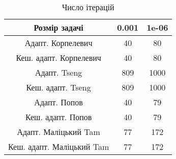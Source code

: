 \begin{table}[H]
	\centering
	\begin{tabular}{|c||c|c|}\hline
		Розмір задачі & 0.001 & 1e-06 \\ \hline \hline
		Адапт. Корпелевич & 40 & 80 \\ \hline
		Кеш. адапт. Корпелевич & 40 & 80 \\ \hline
		Адапт. Tseng & 809 & 1000 \\ \hline
		Кеш. адапт. Tseng & 809 & 1000 \\ \hline
		Адапт. Попов & 40 & 79 \\ \hline
		Кеш. адапт. Попов & 40 & 79 \\ \hline
		Адапт. Маліцький Tam & 77 & 172 \\ \hline
		Кеш. адапт. Маліцький Tam & 77 & 172 \\ \hline
	\end{tabular}
	\caption{Число ітерацій}
\end{table}
